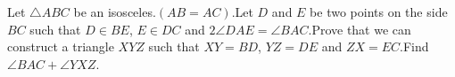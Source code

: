 Let $\triangle ABC$ be an isosceles.$(AB=AC)$.Let $D$ and $E$ be two points on the side $BC$ such that $D\in BE$, $E\in DC$ and $2\angle DAE = \angle BAC$.Prove that we can construct a triangle $XYZ$ such that $XY=BD$, $YZ=DE$ and $ZX=EC$.Find $\angle BAC + \angle YXZ$.
